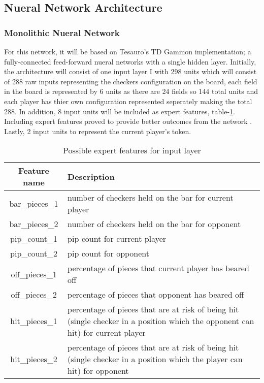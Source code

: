 \documentclass[12pt,a4paper]{article}
\begin{document}
\subsection{Nueral Network Architecture}
\subsubsection{Monolithic Nueral Network}
For this network, it will be based on Tesauro's \citeyear{DBLP:journals/neco/Tesauro94} TD Gammon implementation; a fully-connected feed-forward nueral networks with a single hidden layer. Initially, the architecture will consist of one input layer I with 298 units which will consist of 288 raw inputs representing the checkers configuration on the board, each field in the board is represented by 6 units as there are 24 fields so 144 total units and each player has thier own configuration represented seperately making the total 288. In addition, 8 input units will be included as expert features, table-\ref{exfeat}. Including expert features proved to provide better outcomes from the network \cite{DBLP:journals/ai/Tesauro02}. Lastly, 2 input units to represent the current player's token. 
\begin{table}[htb]
    \centering
    \caption{Possible expert features for input layer}
    \vspace*{6pt}
    \label{exfeat}
    \begin{tabular}{cp{12cm}}
        \hline
        \hline
        Feature name & Description \\ 
        \hline
        bar\_pieces\_1 & number of checkers held on the bar for current player\\
        \hline
        bar\_pieces\_2 & number of checkers held on the bar for opponent\\
        \hline
        pip\_count\_1 & pip count for current player \\
        \hline
        pip\_count\_2 & pip count for opponent \\
        \hline
        off\_pieces\_1 & percentage of pieces that current player has beared off \\
        \hline
        off\_pieces\_2 & percentage of pieces that opponent has beared off \\
        \hline
        hit\_pieces\_1 & percentage of pieces that are at risk of being hit (single checker in a position which the opponent can hit) for current player \\
        \hline
        hit\_pieces\_2 & percentage of pieces that are at risk of being hit (single checker in a position which the player can hit) for opponent\\
        \hline
    \end{tabular}
\end{table}
\end{document}

